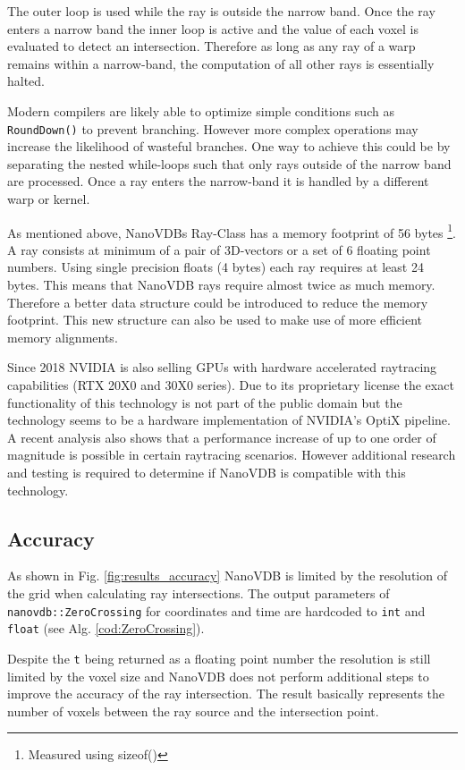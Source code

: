 The outer loop is used while the ray is outside the narrow band. Once the ray enters a narrow band the inner loop is active and the value of each voxel is evaluated to detect an intersection.
Therefore as long as any ray of a warp remains within a narrow-band, the computation of all other rays is essentially halted.

Modern compilers are likely able to optimize simple conditions such as \texttt{RoundDown()} to prevent branching.
However more complex operations may increase the likelihood of wasteful branches. 
One way to achieve this could be by separating the nested while-loops such that only rays outside of the narrow band are processed. 
Once a ray enters the narrow-band it is handled by a different warp or kernel.

As mentioned above, NanoVDBs Ray-Class has a memory footprint of 56 bytes \footnote{Measured using sizeof()}.
A ray consists at minimum of a pair of 3D-vectors or a set of 6 floating point numbers. 
Using single precision floats (4 bytes) each ray requires at least 24 bytes.
This means that NanoVDB rays require almost twice as much memory.
Therefore a better data structure could be introduced to reduce the memory footprint. 
This new structure can also be used to make use of more efficient memory alignments.


Since 2018 NVIDIA is also selling GPUs with hardware accelerated raytracing capabilities (RTX 20X0 and 30X0 series).
Due to its proprietary license the exact functionality of this technology is not part of the public domain but the technology seems to be a hardware implementation of NVIDIA's OptiX pipeline.
A recent analysis \cite{sanzharov2020survey} also shows that a performance increase of up to one order of magnitude is possible in certain raytracing scenarios.
However additional research and testing is required to determine if NanoVDB is compatible with this technology.

\subsection{Accuracy}
As shown in Fig. \ref{fig:results_accuracy} NanoVDB is limited by the resolution of the grid when calculating ray intersections.
The output parameters of \texttt{nanovdb::ZeroCrossing} for coordinates and time are hardcoded to \texttt{int} and \texttt{float} (see Alg. \ref{cod:ZeroCrossing}).

Despite the \texttt{t} being returned as a floating point number the resolution is still limited by the voxel size and NanoVDB does not perform additional steps to improve the accuracy of the ray intersection. 
The result basically represents the number of voxels between the ray source and the intersection point.

